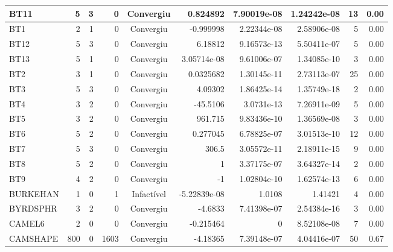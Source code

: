 \begin{center}
\begin{longtable}{|l|r|r|r|c|r|r|r|r|r|}
    BT11 &      5 &      3 &      0 & Convergiu  &    0.824892 &    7.90019e-08 & 1.24242e-08 &     13 &    0.00 \\ \hline
     BT1 &      2 &      1 &      0 & Convergiu  &   -0.999998 &    2.22344e-08 & 2.58906e-08 &      5 &    0.00 \\ \hline
    BT12 &      5 &      3 &      0 & Convergiu  &     6.18812 &    9.16573e-13 & 5.50411e-07 &      5 &    0.00 \\ \hline
    BT13 &      5 &      1 &      0 & Convergiu  & 3.05714e-08 &    9.61006e-07 & 1.34085e-10 &      3 &    0.00 \\ \hline
     BT2 &      3 &      1 &      0 & Convergiu  &   0.0325682 &    1.30145e-11 & 2.73113e-07 &     25 &    0.00 \\ \hline
     BT3 &      5 &      3 &      0 & Convergiu  &     4.09302 &    1.86425e-14 & 1.35749e-18 &      2 &    0.00 \\ \hline
     BT4 &      3 &      2 &      0 & Convergiu  &    -45.5106 &     3.0731e-13 & 7.26911e-09 &      5 &    0.00 \\ \hline
     BT5 &      3 &      2 &      0 & Convergiu  &     961.715 &    9.83436e-10 & 1.36569e-08 &      3 &    0.00 \\ \hline
     BT6 &      5 &      2 &      0 & Convergiu  &    0.277045 &    6.78825e-07 & 3.01513e-10 &     12 &    0.00 \\ \hline
     BT7 &      5 &      3 &      0 & Convergiu  &       306.5 &    3.05572e-11 & 2.18911e-15 &      9 &    0.00 \\ \hline
     BT8 &      5 &      2 &      0 & Convergiu  &           1 &    3.37175e-07 & 3.64327e-14 &      2 &    0.00 \\ \hline
     BT9 &      4 &      2 &      0 & Convergiu  &          -1 &    1.02804e-10 & 1.62574e-13 &      6 &    0.00 \\ \hline
BURKEHAN &      1 &      0 &      1 & Infactível & -5.22839e-08 &         1.0108 &     1.41421 &      4 &    0.00 \\ \hline
BYRDSPHR &      3 &      2 &      0 & Convergiu  &     -4.6833 &    7.41398e-07 & 2.54384e-16 &      3 &    0.00 \\ \hline
  CAMEL6 &      2 &      0 &      0 & Convergiu  &   -0.215464 &              0 & 8.52108e-08 &      7 &    0.00 \\ \hline
CAMSHAPE &    800 &      0 &   1603 & Convergiu  &    -4.18365 &    7.39148e-07 & 4.04416e-07 &     50 &    0.67 \\ \hline

\end{longtable}
\end{center}

